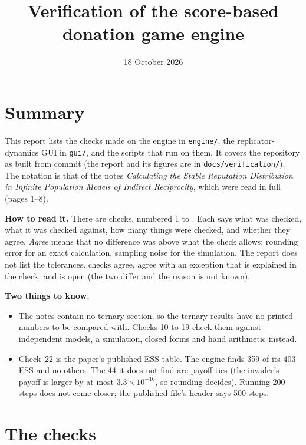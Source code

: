 \documentclass[11pt,a4paper]{article}
\title{Verification of the score-based donation game engine}
\author{}
\date{18 October 2026}
\begin{document}
\maketitle

\section{Summary}

This report lists the checks made on the engine in \texttt{engine/}, the replicator-dynamics GUI in \texttt{gui/}, and the scripts that run on them. It covers the repository as built from commit \texttt{\commit} (the report and its figures are in \texttt{docs/verification/}). The notation is that of the notes \emph{Calculating the Stable Reputation Distribution in Infinite Population Models of Indirect Reciprocity}, which were read in full (pages 1--8).

\textbf{How to read it.} There are \nchecks{} checks, numbered 1 to \nchecks{}. Each says what was checked, what it was checked against, how many things were checked, and whether they agree. \emph{Agree} means that no difference was above what the check allows: rounding error for an exact calculation, sampling noise for the simulation. The report does not list the tolerances. \nagree{} checks agree, \nexception{} agree with an exception that is explained in the check, and \nopen{} is open (the two differ and the reason is not known).

\textbf{Two things to know.}
\begin{itemize}
\item The notes contain no ternary section, so the ternary results have no printed numbers to be compared with. Checks 10 to 19 check them against independent models, a simulation, closed forms and hand arithmetic instead.
\item Check~22 is the paper's published ESS table. The engine finds 359 of its 403 ESS and no others. The 44 it does not find are payoff ties (the invader's payoff is larger by at most $3.3\times10^{-16}$, so rounding decides). Running 200 steps does not come closer; the published file's header says 500 steps.
\end{itemize}



\section{The checks}


\end{document}
